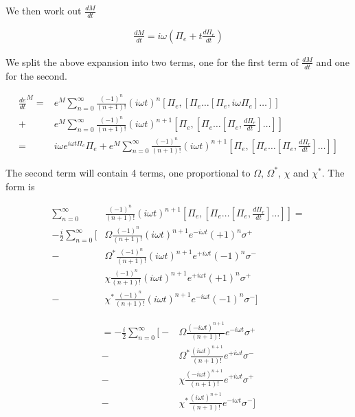\documentclass[12pt]{article}
\newcommand{\ddt}[1]{\frac{d #1}{dt}}
\begin{document}
We then work out $\ddt{M}$

\begin{align}
\ddt{M} = i\omega \left(\Pi_e + t \ddt{\Pi_e} \right)
\end{align}

We split the above expansion into two terms, one for the first term of $\ddt{M}$ and one for the second.

\begin{align}
\ddt e^{M} = &e^M \sum_{n=0}^{\infty} \frac{(-1)^n}{(n+1)!} (i \omega t)^n \left[\Pi_e,\left[\Pi_e\ldots\left[\Pi_e,i\omega \Pi_e\right]\ldots\right]\right]\\
+&e^M \sum_{n=0}^{\infty} \frac{(-1)^n}{(n+1)!} (i \omega t)^{n+1}\left[\Pi_e,\left[\Pi_e\ldots\left[\Pi_e,\ddt{\Pi_e}\right]\ldots\right]\right]\\
=&i\omega e^{i\omega t \Pi_e} \Pi_e +e^M \sum_{n=0}^{\infty} \frac{(-1)^n}{(n+1)!} (i \omega t)^{n+1}\left[\Pi_e,\left[\Pi_e\ldots\left[\Pi_e,\ddt{\Pi_e}\right]\ldots\right]\right]
\end{align}

The second term will contain 4 terms, one proportional to $\Omega$, $\Omega^*$, $\chi$ and $\chi^*$. The form is

\begin{align}
\sum_{n=0}^{\infty}&\frac{(-1)^n}{(n+1)!} (i \omega t)^{n+1}\left[\Pi_e,\left[\Pi_e\ldots\left[\Pi_e,\ddt{\Pi_e}\right]\ldots\right]\right] =\\
-\frac{i}{2}\sum_{n=0}^{\infty}\Bigg[ &\Omega \frac{(-1)^n}{(n+1)!}(i\omega t)^{n+1} e^{-i\omega t} (+1)^n\sigma^+\\
-&\Omega^* \frac{(-1)^n}{(n+1)!}(i\omega t)^{n+1} e^{+i\omega t} (-1)^n\sigma^-\\
&\chi \frac{(-1)^n}{(n+1)!}(i\omega t)^{n+1} e^{+i\omega t} (+1)^n\sigma^+\\
-&\chi^* \frac{(-1)^n}{(n+1)!}(i\omega t)^{n+1} e^{-i\omega t} (-1)^n\sigma^-
\Bigg]
\end{align}

\begin{align}
=-\frac{i}{2}\sum_{n=0}^{\infty}\Bigg[ -&\Omega \frac{(-i\omega t)^{n+1}}{(n+1)!}e^{-i\omega t} \sigma^+\\
-&\Omega^* \frac{(i\omega t)^{n+1}}{(n+1)!} e^{+i\omega t} \sigma^-\\
-&\chi \frac{(-i\omega t)^{n+1}}{(n+1)!} e^{+i\omega t} \sigma^+\\
-&\chi^* \frac{(i\omega t)^{n+1}}{(n+1)!} e^{-i\omega t} \sigma^-
\Bigg]
\end{align}
\end{document}
